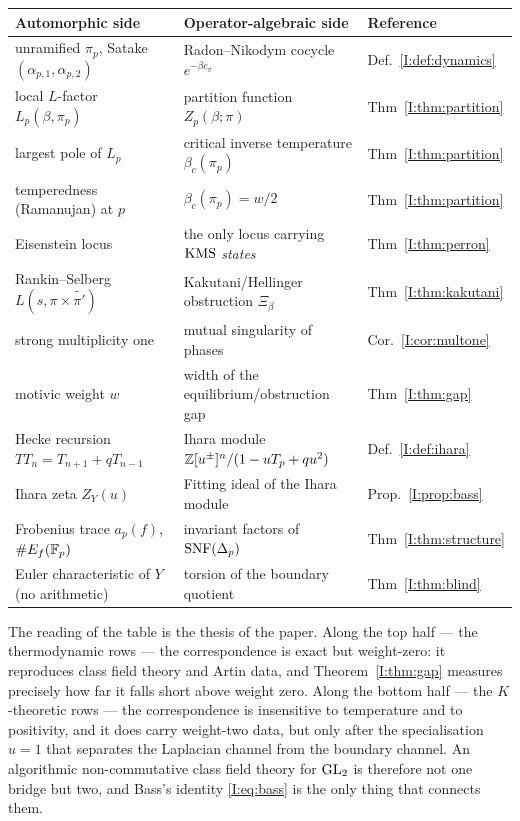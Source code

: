 \begin{center}\small
\renewcommand{\arraystretch}{1.2}
\begin{tabular}{lll}
\toprule
Automorphic side & Operator-algebraic side & Reference\\
\midrule
unramified $\pi_p$, Satake $(\alpha_{p,1},\alpha_{p,2})$
& Radon--Nikodym cocycle $e^{-\beta c_\pi}$ & Def.~\ref{I:def:dynamics}\\
local $L$-factor $L_p(\beta,\pi_p)$
& partition function $Z_p(\beta;\pi)$ & Thm~\ref{I:thm:partition}\\
largest pole of $L_p$
& critical inverse temperature $\beta_c(\pi_p)$ & Thm~\ref{I:thm:partition}\\
temperedness (Ramanujan) at $p$
& $\beta_c(\pi_p)=w/2$ & Thm~\ref{I:thm:partition}\\
Eisenstein locus
& the only locus carrying $\mathrm{KMS}$ \emph{states} & Thm~\ref{I:thm:perron}\\
Rankin--Selberg $L(s,\pi\times\widetilde{\pi'})$
& Kakutani/Hellinger obstruction $\Xi_\beta$ & Thm~\ref{I:thm:kakutani}\\
strong multiplicity one
& mutual singularity of phases & Cor.~\ref{I:cor:multone}\\
motivic weight $w$
& width of the equilibrium/obstruction gap & Thm~\ref{I:thm:gap}\\
Hecke recursion $T T_n=T_{n+1}+qT_{n-1}$
& Ihara module $\mathbb{Z}[u^{\pm}]^n/(1-uT_p+qu^2)$ & Def.~\ref{I:def:ihara}\\
Ihara zeta $Z_Y(u)$
& Fitting ideal of the Ihara module & Prop.~\ref{I:prop:bass}\\
Frobenius trace $a_p(f)$, $\#E_f(\mathbb{F}_p)$
& invariant factors of $\operatorname{SNF}(\Delta_p)$ & Thm~\ref{I:thm:structure}\\
Euler characteristic of $Y$ (no arithmetic)
& torsion of the boundary quotient & Thm~\ref{I:thm:blind}\\
\bottomrule
\end{tabular}
\end{center}

\medskip
The reading of the table is the thesis of the paper. Along the top half --- the
thermodynamic rows --- the correspondence is exact but weight-zero: it reproduces class
field theory and Artin data, and Theorem~\ref{I:thm:gap} measures precisely how far it
falls short above weight zero. Along the bottom half --- the $K$-theoretic rows --- the
correspondence is insensitive to temperature and to positivity, and it does carry
weight-two data, but only after the specialisation $u=1$ that separates the Laplacian
channel from the boundary channel. An algorithmic non-commutative class field theory for
$\mathrm{GL}_2$ is therefore not one bridge but two, and Bass's identity \eqref{I:eq:bass} is the
only thing that connects them.

